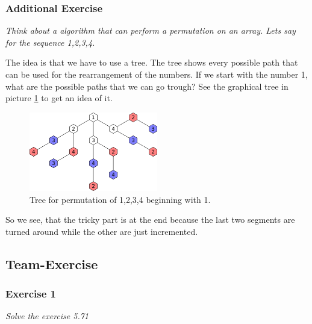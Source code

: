 

\subsubsection*{Additional Exercise}
\textit{Think about a algorithm that can perform a permutation on an array.
Lets say for the sequence 1,2,3,4.}

The idea is that we have to use a tree. The tree shows every possible path
that can be used for the rearrangement of the numbers. If we start with
the number 1, what are the possible paths that we can go trough? See the
graphical tree in picture \ref{pic:tree} to get an idea of it.

\begin{figure}[h!]
	\centering
	\includegraphics[width=0.5\textwidth]{tree.pdf}
	\caption{Tree for permutation of 1,2,3,4 beginning with 1.}
	\label{pic:tree}
\end{figure}

So we see, that the tricky part is at the end because the last two segments
are turned around while the other are just incremented.


\subsection{Team-Exercise}

\subsubsection{Exercise 1}
\textit{Solve the exercise 5.71} \\



